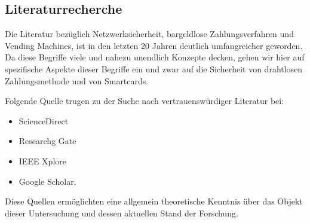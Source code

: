 \subsection{Literaturrecherche}

Die Literatur bezüglich Netzwerksicherheit, bargeldlose Zahlungsverfahren und Vending Machines, ist in den 
letzten 20 Jahren deutlich umfangreicher geworden. Da diese Begriffe viele und nahezu unendlich Konzepte 
decken, gehen wir hier auf spezifische Aspekte dieser Begriffe ein und zwar auf die Sicherheit von drahtlosen 
Zahlungsmethode und von Smartcards. 

Folgende Quelle trugen zu der Suche nach vertrauenswürdiger Literatur bei:

\begin{itemize}
    \item ScienceDirect
    \item Researchg Gate
    \item IEEE Xplore
    \item Google Scholar.
\end{itemize}

Diese Quellen ermöglichten eine allgemein theoretische Kenntnis über das Objekt dieser Untersuchung und dessen aktuellen 
Stand der Forschung.